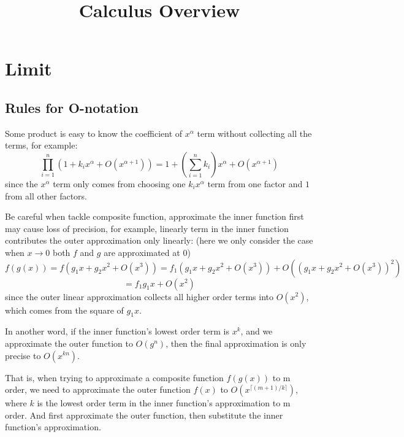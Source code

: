 \documentclass{overview}
\title{Calculus Overview}
\begin{document}
\maketitle

\section{Limit}

\subsection{Rules for O-notation}

Some product is easy to know the coefficient of $x^{\alpha}$ term without collecting
all the terms, for example:
\[
	\prod_{i=1}^n (1 + k_i x^{\alpha}+ O(x^{\alpha+1})) 
	= 1 + \left(\sum_{i=1}^n k_i\right) x^{\alpha} + O(x^{\alpha+1})
\] 
since the $x^{\alpha}$ term only comes from choosing one $k_i x^{\alpha}$ term
from one factor and $1$ from all other factors.

Be careful when tackle composite function, approximate the inner function first may
cause loss of precision, for example, linearly term in the inner function contributes
the outer approximation only linearly: (here we only consider the case when $x \to 0$
both $f$ and $g$ are approximated at $0$)
\[
f(g(x)) = f(g_1 x + g_2 x^2 + O(x^3)) = f_1(g_1 x + g_2 x^2 + O(x^3))
+ O((g_1 x + g_2 x^2 + O(x^3))^2)
\] 
\[
= f_1g_1 x + O(x^2)
\] 
since the outer linear approximation collects all higher order terms into $O(x^2)$,
which comes from the square of $ g_1 x$. 

In another word, if the inner function's lowest order term is $x^{k}$, and 
we approximate the outer function to $O(g^{n})$, then the final
approximation is only precise to $O(x^{kn})$.

That is, when trying to approximate a composite function $f(g(x))$ to m order, we need to
approximate the outer function $f(x)$ to $O(x^{\lceil (m+1)/k \rceil})$, where $k$ is
the lowest order term in the inner function's approximation to m order.
And first approximate the outer function, then substitute the inner function's
approximation.
\end{document}

